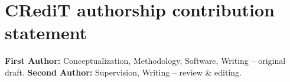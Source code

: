 
\section*{CRediT authorship contribution statement}
\textbf{First Author:} Conceptualization, Methodology, Software, Writing --
original draft. \textbf{Second Author:} Supervision, Writing -- review \&
editing.
